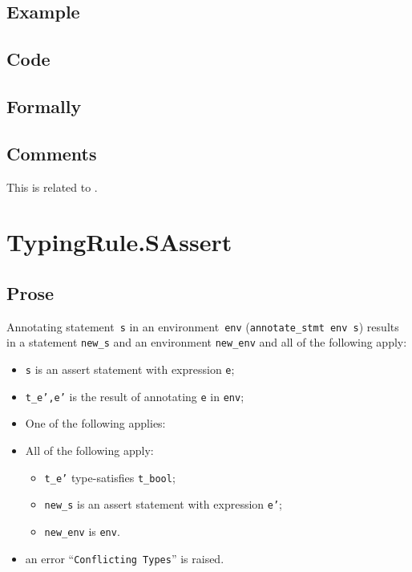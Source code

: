 \documentclass{book}
\begin{document}
  \subsection{Example}

  \subsection{Code}

\begin{emptyformal}
    \subsection{Formally}
\end{emptyformal}

\subsection{Comments}
    This is related to .

\section{TypingRule.SAssert \label{sec:TypingRule.SAssert}}

  \subsection{Prose}
Annotating statement~\texttt{s} in an environment~\texttt{env}
(\texttt{annotate\_stmt env s}) results in a statement \texttt{new\_s} and an
environment \texttt{new\_env} and all of the following apply:
   \begin{itemize}
   \item \texttt{s} is an assert statement with expression \texttt{e};
   \item \texttt{t\_e',e'} is the result of annotating \texttt{e} in \texttt{env};
   \item One of the following applies:
     \item All of the following apply:
       \begin{itemize}
       \item \texttt{t\_e'} type-satisfies \texttt{t\_bool};
       \item \texttt{new\_s} is an assert statement with expression \texttt{e'};
       \item \texttt{new\_env} is \texttt{env}.
       \end{itemize}
     \item an error ``\texttt{Conflicting Types}'' is raised.
   \end{itemize}
\end{document}
